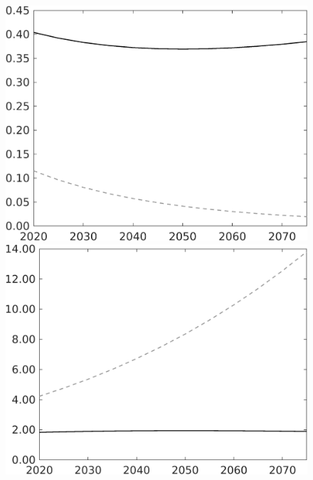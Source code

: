 \documentclass[12pt]{article}
\begin{document}
\begin{figure}[h!!]
\begin{minipage}[]{0.32\textwidth}
	\end{minipage}	
	\begin{minipage}[]{0.32\textwidth}
		\includegraphics[width=1\textwidth]{../../codding_model/own_basedOnFried/optimalPol_010922_revision/figures/all_13Sept22/LevTaufNoTauf_TaulCalib_regime0_GFF_spillover0_nsk1_xgr0_knspil1_sep1_LFlimit0_emsbase0_countec0_GovRev0_etaa0.79_lgd0.png}
	\end{minipage}	
	\begin{minipage}[]{0.32\textwidth}
		\includegraphics[width=1\textwidth]{../../codding_model/own_basedOnFried/optimalPol_010922_revision/figures/all_13Sept22/LevTaufNoTauf_TaulCalib_regime0_pgpftf_spillover0_nsk1_xgr0_knspil1_sep1_LFlimit0_emsbase0_countec0_GovRev0_etaa0.79_lgd0.png}

\end{minipage}
\end{figure}
\end{document}
